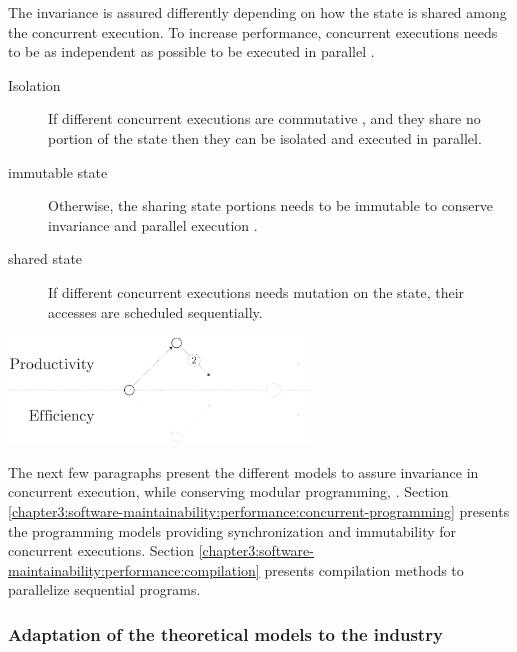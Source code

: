 The invariance is assured differently depending on how the state is shared among the concurrent execution.
To increase performance, concurrent executions needs to be as independent as possible to be executed in parallel .
\begin{description}
  \item[Isolation] If different concurrent executions are commutative \cite{Rinard1996,Clements2013a}, and they share no portion of the state then they can be isolated and executed in parallel.
  \item[immutable state] Otherwise, the sharing state portions needs to be immutable to conserve invariance and parallel execution \cite{Gordon2012,Matsakis2012a}.
  \item[shared state] If different concurrent executions needs mutation on the state, their accesses are scheduled sequentially.
\end{description}

\begin{center}
\includegraphics[width=0.6\textwidth]{../ressources/state-of-the-art-2.pdf}
\end{center}

The next few paragraphs present the different models to assure invariance in concurrent execution, while conserving modular programming, .
Section \ref{chapter3:software-maintainability:performance:concurrent-programming} presents the programming models providing synchronization and immutability for concurrent executions.
Section \ref{chapter3:software-maintainability:performance:compilation} presents compilation methods to parallelize sequential programs.



\subsubsection{Adaptation of the theoretical models to the industry}

